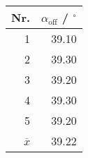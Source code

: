 \begin{tabular}{r|r}\\
 Nr. & $\alpha_\text{off}$ / ${}^\circ$  \\
 \hline
1 & 39.10\\
2 & 39.30\\
3 & 39.20\\
4 & 39.30\\
5 & 39.20\\
\hline \
 $\overline{x}$ & 39.22
\end{tabular}
